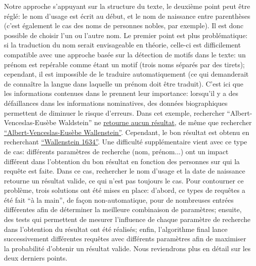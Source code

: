 Notre approche s'appuyant sur la structure du texte, le deuxième point peut être réglé: le nom d'usage est écrit au début, et le nom de naissance entre parenthèses (c'est également le cas des noms de personnes nobles, par exemple). Il est donc possible de choisir l'un ou l'autre nom. Le premier point est plus problématique: si la traduction du nom serait envisageable en théorie, celle-ci est difficilement compatible avec une approche basée sur la détection de motifs dans le texte: un prénom est repérable comme étant un motif (trois noms séparés par des tirets); cependant, il est impossible de le traduire automatiquement (ce qui demanderait de connaître la langue dans laquelle un prénom doit être traduit). C'est ici que les informations contenues dans le \ttrait{} prennent leur importance: lorsqu'il y a des défaillances dans les informations nominatives, des données biographiques permettent de diminuer le risque d'erreurs. Dans cet exemple, rechercher \enquote{Albert-Venceslas-Eusèbe Waldstein} ne \href{https://www.wikidata.org/w/index.php?search=Albert-Venceslas-Eus%C3%A8be+de+Waldstein&title=Special:Search&profile=advanced&fulltext=1&ns0=1&ns120=1}{retourne aucun résultat}, de même que rechercher \href{https://www.wikidata.org/w/index.php?search=Albert-Venceslas-Eus%C3%A8be+Wallenstein&title=Special:Search&profile=advanced&fulltext=1&ns0=1&ns120=1}{\enquote{Albert-Venceslas-Eusèbe Wallenstein}}. Cependant, le bon résultat est obtenu en recherchant \href{https://www.wikidata.org/w/index.php?search=Wallenstein+1634&title=Special:Search&profile=advanced&fulltext=1&ns0=1&ns120=1}{\enquote{Wallenstein 1634}}. Une difficulté supplémentaire vient avec ce type de cas: différents paramètres de recherche (nom, prénom...) ont un impact différent dans l'obtention du bon résultat en fonction des personnes sur qui la requête est faite. Dans ce cas, rechercher le nom d'usage et la date de naissance retourne un résultat valide, ce qui n'est pas toujours le cas. Pour contourner ce problème, trois solutions ont été mises en place: d'abord, ce types de requêtes a été fait \enquote{à la main}, de façon non-automatique, pour de nombreuses entrées différentes afin de déterminer la meilleure combinaison de paramètres; ensuite, des tests qui permettent de mesurer l'influence de chaque paramètre de recherche dans l'obtention du résultat ont été réalisés; enfin, l'algorithme final lance successivement différentes requêtes avec différents paramètres afin de maximiser la probabilité d'obtenir un résultat valide. Nous reviendrons plus en détail sur les deux derniers points.

